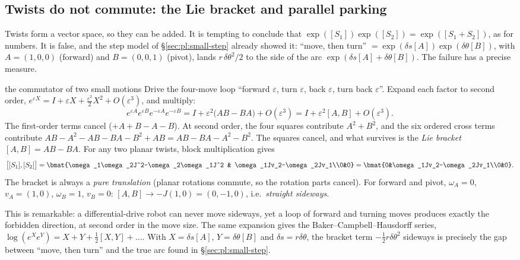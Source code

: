 \subsection{Twists do not commute: the Lie bracket and parallel parking}\label{sec:pl:lie-bracket}

Twists form a vector space, so they can be added. It is tempting to conclude that $\exp([S_1])\exp([S_2])=\exp([S_1+S_2])$, as for numbers. It is false, and the step model of \S\ref{sec:pl:small-step} already showed it: ``move, then turn'' $=\exp(\delta s[A])\exp(\delta\theta[B])$, with $A=(1,0,0)$ (forward) and $B=(0,0,1)$ (pivot), lands $r\,\delta\theta^2/2$ to the side of the arc $\exp(\delta s[A]+\delta\theta[B])$. The failure has a precise measure.

\begin{deriv}{the commutator of two small motions}
Drive the four-move loop ``forward $\varepsilon$, turn $\varepsilon$, back $\varepsilon$, turn back $\varepsilon$''. Expand each factor to second order, $e^{\varepsilon X}=I+\varepsilon X+\frac{\varepsilon^2}2X^2+O(\varepsilon^3)$, and multiply:
\[
e^{\varepsilon A}e^{\varepsilon B}e^{-\varepsilon A}e^{-\varepsilon B}=I+\varepsilon^2\big(AB-BA\big)+O(\varepsilon^3)=I+\varepsilon^2[A,B]+O(\varepsilon^3).
\]
The first-order terms cancel ($+A+B-A-B$). At second order, the four squares contribute $A^2+B^2$, and the six ordered cross terms contribute $AB-A^2-AB-BA-B^2+AB=AB-BA-A^2-B^2$. The squares cancel, and what survives is the \emph{Lie bracket} $[A,B]=AB-BA$. For any two planar twists, block multiplication gives
\[
\big[[S_1],[S_2]\big]=\bmat{\omega_1\omega_2J^2-\omega_2\omega_1J^2 & \omega_1Jv_2-\omega_2Jv_1\\0&0}=\bmat{0&\omega_1Jv_2-\omega_2Jv_1\\0&0}.
\]
The bracket is always a \emph{pure translation} (planar rotations commute, so the rotation parts cancel). For forward and pivot, $\omega_A=0$, $v_A=(1,0)$, $\omega_B=1$, $v_B=0$: $[A,B]\to-J(1,0)=(0,-1,0)$, i.e.\ \emph{straight sideways}.
\end{deriv}

This is remarkable: a differential-drive robot can never move sideways, yet a loop of forward and turning moves produces exactly the forbidden direction, at second order in the move size. The same expansion gives the Baker--Campbell--Hausdorff series, $\log(e^Xe^Y)=X+Y+\frac12[X,Y]+\dots$. With $X=\delta s[A]$, $Y=\delta\theta[B]$ and $\delta s=r\delta\theta$, the bracket term $-\frac12r\delta\theta^2$ sideways is precisely the gap between ``move, then turn'' and the true arc found in \S\ref{sec:pl:small-step}.

